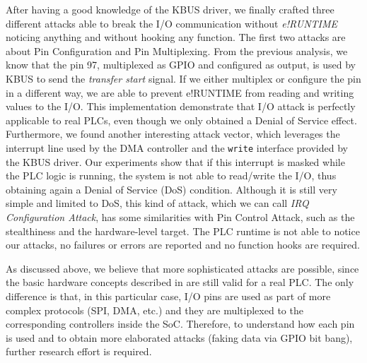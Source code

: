 After having a good knowledge of the KBUS driver, we finally crafted three different attacks able to break the I/O communication without \emph{e!RUNTIME}
noticing anything and without hooking any function. The first two attacks are about Pin Configuration and Pin Multiplexing.
From the previous analysis, we know that the pin 97, multiplexed as GPIO and configured as output, is used by KBUS to send the \emph{transfer start} signal.
If we either multiplex or configure the pin in a different way, we are able to prevent e!RUNTIME from reading and writing values to the I/O.
This implementation demonstrate that I/O attack is perfectly applicable to real PLCs, even though we only obtained a Denial of Service effect.
Furthermore, we found another interesting attack vector, which leverages the interrupt line used by the DMA controller and the \verb|write| interface provided by the KBUS driver.
Our experiments show that if this interrupt is masked while the PLC logic is running, the system is not able to read/write the I/O, thus obtaining again a
Denial of Service (DoS) condition. Although it is still very simple and limited to DoS, this kind of attack, which we can call \emph{IRQ Configuration Attack},
has some similarities with Pin Control Attack, such as the stealthiness and the hardware-level target.
The PLC runtime is not able to notice our attacks, no failures or errors are reported and no function hooks are required.

As discussed above, we believe that more sophisticated attacks are possible, since the basic hardware concepts described in 
are still valid for a real PLC. The only difference is that, in this particular case, I/O pins are used as part of more complex protocols (SPI, DMA, etc.) and
they are multiplexed to the corresponding controllers inside the SoC. Therefore, to understand how each pin is used and to obtain more elaborated attacks
(\eg faking data via GPIO bit bang), further research effort is required.

